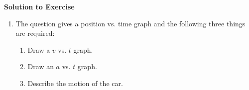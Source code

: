 {\begin{mdframed}[linewidth=4, leftmargin=40, rightmargin=40]
\begin{exercise}
      \par 
      
      \vspace{5pt}
      \label{m38795*solfhsst!!!underscore!!!id3435}\noindent\textbf{Solution to Exercise } \label{m38795*listfhsst!!!underscore!!!id3435}\begin{enumerate}[noitemsep, label=\textbf{Step} \textbf{\arabic*}. ] 
            \leftskip=20pt\rightskip=\leftskip\item  
      \label{m38795*id73362}The question gives a position vs. time graph and the following three things are required:\par 
      \label{m38795*id73366}\begin{enumerate}[noitemsep, label=\textbf{\alph*}. ] 
            \leftskip=20pt\rightskip=\leftskip\label{m38795*uid124}\item Draw a \begin{math}v\end{math} vs. \begin{math}t\end{math} graph.
\label{m38795*uid125}\item Draw an \begin{math}a\end{math} vs. \begin{math}t\end{math} graph.
\label{m38795*uid126}\item Describe the motion of the car.
\end{enumerate}
        

\end{enumerate}
\end{exercise}
\end{mdframed}}
